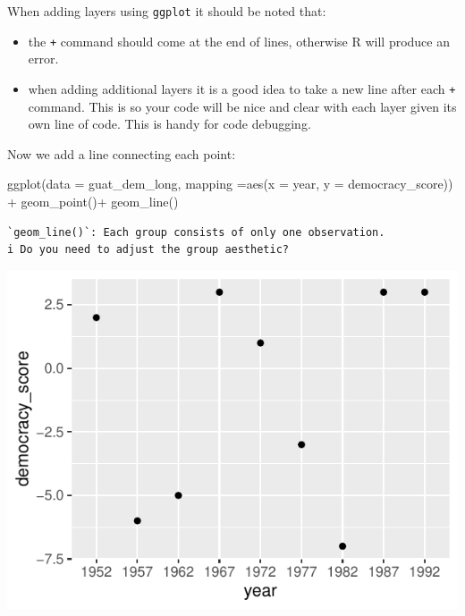 \documentclass[
  letterpaper,
  DIV=11,
  numbers=noendperiod]{scrartcl}
\newenvironment{Shaded}{\begin{snugshade}}{\end{snugshade}}
\newcommand{\AttributeTok}[1]{\textcolor[rgb]{0.40,0.45,0.13}{#1}}
\newcommand{\FunctionTok}[1]{\textcolor[rgb]{0.28,0.35,0.67}{#1}}
\newcommand{\NormalTok}[1]{\textcolor[rgb]{0.00,0.23,0.31}{#1}}
\newcommand{\SpecialCharTok}[1]{\textcolor[rgb]{0.37,0.37,0.37}{#1}}
\providecommand{\tightlist}{%
  \setlength{\itemsep}{0pt}\setlength{\parskip}{0pt}}\usepackage{longtable,booktabs,array}
\begin{document}
When adding layers using \texttt{ggplot} it should be noted that:

\begin{itemize}
\tightlist
\item
  the \texttt{+} command should come at the end of lines, otherwise R
  will produce an error.
\item
  when adding additional layers it is a good idea to take a new line
  after each \texttt{+} command. This is so your code will be nice and
  clear with each layer given its own line of code. This is handy for
  code debugging.
\end{itemize}

Now we add a line connecting each point:

\begin{Shaded}
\begin{Highlighting}[]
\FunctionTok{ggplot}\NormalTok{(}\AttributeTok{data =}\NormalTok{ guat\_dem\_long, }\AttributeTok{mapping =}\FunctionTok{aes}\NormalTok{(}\AttributeTok{x =}\NormalTok{ year, }\AttributeTok{y =}\NormalTok{ democracy\_score)) }\SpecialCharTok{+}
  \FunctionTok{geom\_point}\NormalTok{()}\SpecialCharTok{+}
  \FunctionTok{geom\_line}\NormalTok{()}
\end{Highlighting}
\end{Shaded}

\begin{verbatim}
`geom_line()`: Each group consists of only one observation.
i Do you need to adjust the group aesthetic?
\end{verbatim}

\begin{center}
\includegraphics{notes_files/figure-pdf/unnamed-chunk-15-1.pdf}
\end{center}
\end{document}
